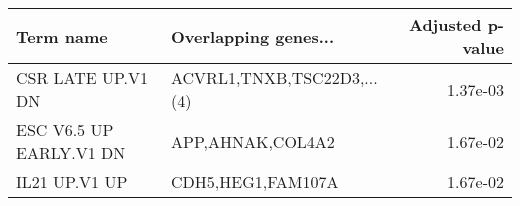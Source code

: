 \begin{tabular}{llr}
\toprule
              Term name &       Overlapping genes... &  Adjusted p-value \\
\midrule
      CSR LATE UP.V1 DN & ACVRL1,TNXB,TSC22D3,...(4) &          1.37e-03 \\
ESC V6.5 UP EARLY.V1 DN &           APP,AHNAK,COL4A2 &          1.67e-02 \\
          IL21 UP.V1 UP &          CDH5,HEG1,FAM107A &          1.67e-02 \\
\bottomrule
\end{tabular}
